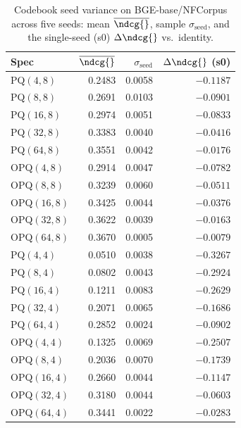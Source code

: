 \begin{table}[t]
\centering
\small
\caption{Codebook seed variance on BGE-base/NFCorpus across five seeds: mean $\overline{\ndcg{}}$, sample $\sigma_{\text{seed}}$, and the single-seed (s0) $\Delta\ndcg{}$ vs.\ identity.}
\label{tab:seed-variance-bge-base-nfcorpus}
\begin{tabular}{lrrr}
\toprule
Spec & $\overline{\ndcg{}}$ & $\sigma_{\text{seed}}$ & $\Delta\ndcg{}$ (s0) \\
\midrule
PQ$(4,8)$ & 0.2483 & 0.0058 & $-0.1187$ \\
PQ$(8,8)$ & 0.2691 & 0.0103 & $-0.0901$ \\
PQ$(16,8)$ & 0.2974 & 0.0051 & $-0.0833$ \\
PQ$(32,8)$ & 0.3383 & 0.0040 & $-0.0416$ \\
PQ$(64,8)$ & 0.3551 & 0.0042 & $-0.0176$ \\
OPQ$(4,8)$ & 0.2914 & 0.0047 & $-0.0782$ \\
OPQ$(8,8)$ & 0.3239 & 0.0060 & $-0.0511$ \\
OPQ$(16,8)$ & 0.3425 & 0.0044 & $-0.0376$ \\
OPQ$(32,8)$ & 0.3622 & 0.0039 & $-0.0163$ \\
OPQ$(64,8)$ & 0.3670 & 0.0005 & $-0.0079$ \\
PQ$(4,4)$ & 0.0510 & 0.0038 & $-0.3267$ \\
PQ$(8,4)$ & 0.0802 & 0.0043 & $-0.2924$ \\
PQ$(16,4)$ & 0.1211 & 0.0083 & $-0.2629$ \\
PQ$(32,4)$ & 0.2071 & 0.0065 & $-0.1686$ \\
PQ$(64,4)$ & 0.2852 & 0.0024 & $-0.0902$ \\
OPQ$(4,4)$ & 0.1325 & 0.0069 & $-0.2507$ \\
OPQ$(8,4)$ & 0.2036 & 0.0070 & $-0.1739$ \\
OPQ$(16,4)$ & 0.2660 & 0.0044 & $-0.1147$ \\
OPQ$(32,4)$ & 0.3180 & 0.0044 & $-0.0603$ \\
OPQ$(64,4)$ & 0.3441 & 0.0022 & $-0.0283$ \\
\bottomrule
\end{tabular}
\end{table}

